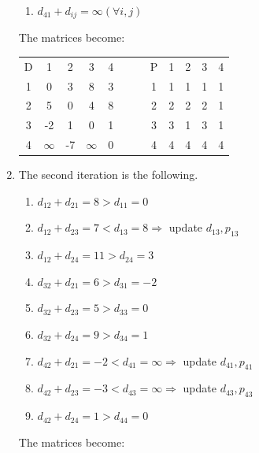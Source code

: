 \documentclass[12pt, a4paper]{report}
\newtheorem[style=M,bodystyle=\normalfont]{theorem}{Theorem}
\newtheorem[style=M,bodystyle=\normalfont]{corollary}{Corollary}
\newtheorem[style=M,bodystyle=\normalfont]{lemma}{Lemma}
\newtheorem[style=M,bodystyle=\normalfont]{definition}{Definition}
\begin{document}
\begin{enumerate}
\begin{enumerate}
                    \item $d_{41} + d_{ij} = \infty (\forall i, j)$
                \end{enumerate}
                The matrices become: 
                \begin{table}[H]
                    \centering
                    \begin{tabular}{c|cccccc|cccc}
                    D & 1        & 2  & 3        & 4 & $\:\:\:\:\:\:$ & P & 1 & 2 & 3 & 4 \\ \cline{1-5} \cline{7-11} 
                    1 & 0        & 3  & 8        & 3 &                & 1 & 1 & 1 & 1 & 1 \\
                    2 & 5        & 0  & 4        & 8 &                & 2 & 2 & 2 & 2 & 1 \\
                    3 & -2       & 1  & 0        & 1 &                & 3 & 3 & 1 & 3 & 1 \\
                    4 & $\infty$ & -7 & $\infty$ & 0 &                & 4 & 4 & 4 & 4 & 4
                    \end{tabular}
                \end{table}
            \item The second iteration is the following. 
                \begin{enumerate}
                    \item $d_{12} + d_{21} = 8 > d_{11} = 0$
                    \item $d_{12} + d_{23} = 7 < d_{13} = 8 \Rightarrow$ update $d_{13}, p_{13}$
                    \item $d_{12} + d_{24} = 11 > d_{24} = 3$
                    \item $d_{32} + d_{21} = 6 > d_{31} = -2$
                    \item $d_{32} + d_{23} = 5 > d_{33} = 0$
                    \item $d_{32} + d_{24} = 9 > d_{34} = 1$
                    \item $d_{42} + d_{21} = -2 < d_{41} = \infty \Rightarrow$ update $d_{41}, p_{41}$
                    \item $d_{42} + d_{23} = -3 < d_{43} = \infty \Rightarrow$ update $d_{43}, p_{43}$
                    \item $d_{42} + d_{24} = 1 > d_{44} = 0$
                \end{enumerate}
                The matrices become: 
                \begin{table}[H]
                    \centering

\end{table}
\end{enumerate}
\end{document}
